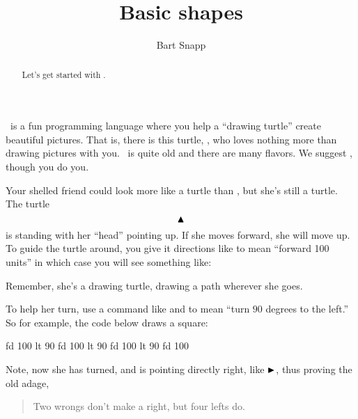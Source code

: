 \documentclass[noauthor,nooutcomes,12pt]{ximera}
\title{Basic shapes}
\author{Bart Snapp}
\begin{document}
\begin{abstract}
Let's get started with \LOGO.
\end{abstract}
\maketitle

\nameblankgen

\begin{multicols}{2}
\LOGO~is a fun programming language where you help a ``drawing
turtle'' create beautiful pictures. That is, there is this turtle,
\turtle, who loves nothing more than drawing pictures with
you. \LOGO~is quite old and there are many flavors. We suggest
\logoFlavor, though you do you.

Your shelled friend could look more like a turtle than \turtle, but
she's still a turtle. The turtle
\[
\text{$\blacktriangle$}
\]
is standing with her ``head'' pointing up. If she moves forward, she
will move up.  To guide the turtle around, you give it directions like
 to mean ``forward 100 units'' in which case you will see
something like:
\begin{logoout}
\end{logoout}
Remember, she's a drawing turtle, drawing a path wherever she goes.

To help her turn, use a command like and  to mean ``turn
$90$ degrees to the left.'' So for example, the code below draws a
square:

\begin{logo}
fd 100
lt 90
fd 100
lt 90
fd 100
lt 90
fd 100
\end{logo}
\begin{logoout}
\end{logoout}

Note, now she has turned, and is pointing directly right, like
$\text{$\blacktriangleright$}$, thus proving the old adage,
\begin{quote}
  Two wrongs don't make a right, but four lefts do.
\end{quote}
\end{multicols}
\end{document}
